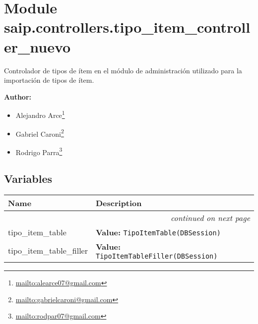 %
%
%


\section{Module saip.controllers.tipo\_item\_controller\_nuevo}

    \label{saip:controllers:tipo_item_controller_nuevo}
Controlador de tipos de ítem en el módulo de administración utilizado para 
la importación de tipos de ítem.

\textbf{Author:} \begin{itemize}
\setlength{\parskip}{0.6ex}
  \item Alejandro 
    Arce\footnote{\href{mailto:alearce07@gmail.com}{mailto:alearce07@gmail.com}}

  \item Gabriel 
    Caroni\footnote{\href{mailto:gabrielcaroni@gmail.com}{mailto:gabrielcaroni@gmail.com}}

  \item Rodrigo 
    Parra\footnote{\href{mailto:rodpar07@gmail.com}{mailto:rodpar07@gmail.com}}

\end{itemize}





  \subsection{Variables}

    \vspace{-1cm}
\hspace{\varindent}\begin{longtable}{|p{\varnamewidth}|p{\vardescrwidth}|l}
\cline{1-2}
\cline{1-2} \centering \textbf{Name} & \centering \textbf{Description}& \\
\cline{1-2}
\endhead\cline{1-2}\multicolumn{3}{r}{\small\textit{continued on next page}}\\\endfoot\cline{1-2}
\endlastfoot\raggedright t\-i\-p\-o\-\_\-i\-t\-e\-m\-\_\-t\-a\-b\-l\-e\- & \raggedright \textbf{Value:} 
{\tt TipoItemTable(DBSession)}&\\
\cline{1-2}
\raggedright t\-i\-p\-o\-\_\-i\-t\-e\-m\-\_\-t\-a\-b\-l\-e\-\_\-f\-i\-l\-l\-e\-r\- & \raggedright \textbf{Value:} 
{\tt TipoItemTableFiller(DBSession)}&\\
\cline{1-2}
\end{longtable}


